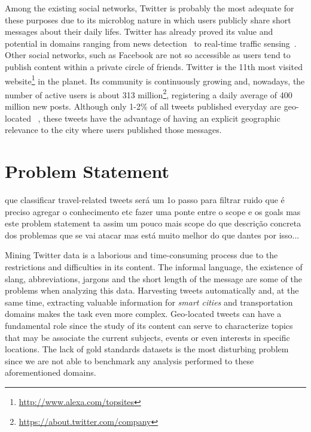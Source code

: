Among the existing social networks, Twitter is probably the most adequate for these purposes due to its microblog nature in which users publicly share short messages about their daily lifes. Twitter has already proved its value and potential in domains ranging from news detection~\cite{kn:Sankaranarayanan2009} to real-time traffic sensing~\cite{carvalho2010real}. Other social networks, such as Facebook are not so accessible as users tend to publish content within a private circle of friends. Twitter is the 11th most visited website\footnote{\url{http://www.alexa.com/topsites}} in the planet. Its community is continuously growing and, nowadays, the number of active users is about 313 million\footnote{\url{https://about.twitter.com/company}}, registering a daily average of 400 million new posts. Although only 1-2\% of all tweets published everyday are geo-located ~\cite{ikeda2013twitter}, these tweets have the advantage of having an explicit geographic relevance to the city where users published those messages.

\section{Problem Statement}\label{sec:problem}

que classificar travel-related tweets será um 1o passo para filtrar ruido
que é preciso agregar o conhecimento
etc
fazer uma ponte entre o scope e os goals
mas este problem statement ta assim um pouco mais scope do que descrição concreta dos problemas que se vai atacar
mas está muito melhor do que dantes
por isso...


Mining Twitter data is a laborious and time-consuming process due to the restrictions and difficulties in its content. The informal language, the existence of slang, abbreviations, jargons and the short length of the message are some of the problems when analyzing this data. Harvesting tweets automatically and, at the same time, extracting valuable information for \textit{smart cities} and transportation domains makes the task even more complex. Geo-located tweets can have a fundamental role since the 
study of its content can serve to characterize topics that may be associate the current subjects, events or even interests in specific locations.
The lack of gold standards datasets is the most disturbing problem since we are not able to benchmark any analysis performed to these aforementioned domains.

